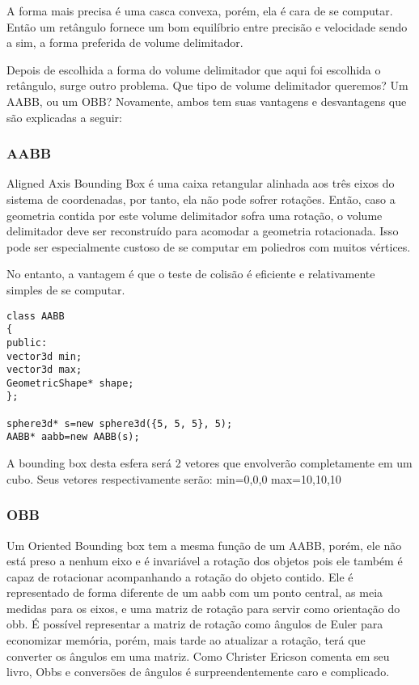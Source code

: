 A forma mais precisa é uma casca convexa, porém, ela é cara de se computar.
Então um retângulo fornece um bom equilíbrio entre precisão e velocidade sendo
a sim, a forma preferida de volume delimitador.

Depois de escolhida a forma do volume delimitador que aqui foi escolhida o
retângulo, surge outro problema. Que tipo de volume delimitador queremos? Um
AABB, ou um OBB? Novamente, ambos tem suas vantagens e desvantagens que são
explicadas a seguir:

\subsubsection{AABB}
Aligned Axis Bounding Box é uma caixa retangular alinhada aos três eixos do
sistema de coordenadas, por tanto, ela não pode sofrer rotações. Então, caso a
geometria contida por este volume delimitador sofra uma rotação, o volume
delimitador deve ser reconstruído para acomodar a geometria rotacionada. Isso
pode ser especialmente custoso de se computar em poliedros com muitos vértices.

No entanto, a vantagem é que o teste de colisão é eficiente e relativamente
simples de se computar.

\begin{lstlisting}[frame=single,caption=Exemplo de AABB\label{codigo1}]
class AABB
{
public:
vector3d min;
vector3d max;
GeometricShape* shape;
};

sphere3d* s=new sphere3d({5, 5, 5}, 5);
AABB* aabb=new AABB(s);
\end{lstlisting}

A bounding box desta esfera será 2 vetores que envolverão completamente em um cubo.
Seus vetores respectivamente serão:
min={0,0,0}
max={10,10,10}


\subsubsection{OBB}

Um Oriented Bounding box tem a mesma função de um AABB, porém, ele não está
preso a nenhum eixo e é invariável a rotação dos objetos pois ele também é
capaz de rotacionar acompanhando a rotação do objeto contido. Ele é
representado de forma diferente de um aabb com um ponto central, as meia
medidas para os eixos, e uma matriz de rotação para servir como orientação do
obb. É possível representar a matriz de rotação como ângulos de Euler para
economizar memória, porém, mais tarde ao atualizar a rotação, terá que
converter os ângulos em uma matriz. Como Christer Ericson comenta em seu livro,
Obbs e conversões de ângulos é surpreendentemente caro e complicado.

